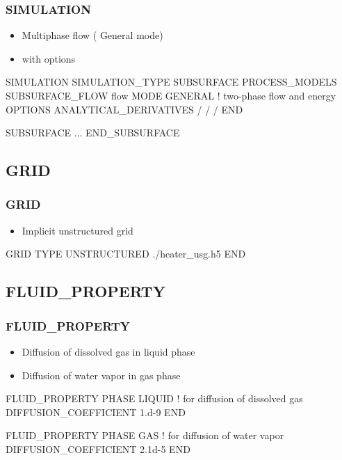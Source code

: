 \documentclass{beamer}
\newcommand\redcomment[1]{{{\color{red} #1}}}
\newcommand\bluecomment[1]{{{\color{blue} #1}}}
\begin{document}
\begin{frame}[fragile]\frametitle{SIMULATION}

\begin{itemize}
  \item Multiphase flow (\redcomment{General mode})
  \item with \redcomment{options}
\end{itemize}

\begin{semiverbatim}\small
SIMULATION
  SIMULATION_TYPE SUBSURFACE
  PROCESS_MODELS
    SUBSURFACE_FLOW flow
      MODE GENERAL \bluecomment{! two-phase flow and energy}
      OPTIONS
        ANALYTICAL_DERIVATIVES
      /   
    /   
  /
END

SUBSURFACE
...
END_SUBSURFACE
\end{semiverbatim}

\end{frame}

\subsection{GRID}

\begin{frame}[fragile]\frametitle{GRID}

\begin{itemize}
  \item Implicit \redcomment{unstructured} grid 
\end{itemize}

\begin{semiverbatim}
GRID
  TYPE UNSTRUCTURED ./heater_usg.h5
END
\end{semiverbatim}

\end{frame}

\subsection{FLUID\_PROPERTY}

\begin{frame}[fragile]\frametitle{FLUID\_PROPERTY}
\begin{itemize}
  \item Diffusion of dissolved gas in \redcomment{liquid phase}
  \item Diffusion of water vapor in \redcomment{gas phase}
\end{itemize}

\begin{semiverbatim}

FLUID_PROPERTY
  PHASE LIQUID \bluecomment{! for diffusion of dissolved gas}
  DIFFUSION_COEFFICIENT 1.d-9
END

FLUID_PROPERTY
  PHASE GAS \bluecomment{! for diffusion of water vapor}
  DIFFUSION_COEFFICIENT 2.1d-5
END
\end{semiverbatim}

\end{frame}
\end{document}
